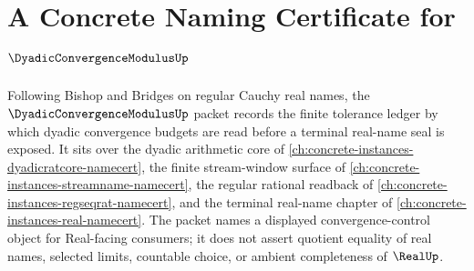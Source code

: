 \chapter{A Concrete Naming Certificate for $\DyadicConvergenceModulusUp$}
\label{ch:concrete-instances-dyadic-convergence-modulus-namecert}

Following Bishop and Bridges on regular Cauchy real names, the $\DyadicConvergenceModulusUp$ packet records the finite tolerance ledger by which dyadic convergence budgets are read before a terminal real-name seal is exposed. It sits over the dyadic arithmetic core of \autoref{ch:concrete-instances-dyadicratcore-namecert}, the finite stream-window surface of \autoref{ch:concrete-instances-streamname-namecert}, the regular rational readback of \autoref{ch:concrete-instances-regseqrat-namecert}, and the terminal real-name chapter of \autoref{ch:concrete-instances-real-namecert}. The packet names a displayed convergence-control object for Real-facing consumers; it does not assert quotient equality of real names, selected limits, countable choice, or ambient completeness of $\RealUp$.

